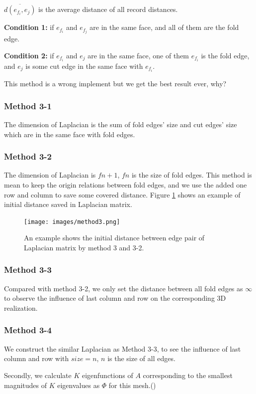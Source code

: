 $\overline{d(e_{f_i},e_j)}$ is the average distance of all record distances.  

\textbf{Condition 1:} if $e_{f_i}$ and  $e_{f_j}$ are in the same face, and all of them are the fold edge.

\textbf{Condition 2:} if $e_{f_i}$ and  $e_{j}$ are in the same face, one of them $e_{f_i}$ is the fold edge, and $e_j$ is some cut edge in the same face with $e_{f_i}$.

This method is a wrong implement but we get the best result ever, why?

\subsubsection{Method 3-1}
The dimension of Laplacian is the sum of fold edges' size and cut edges' size which are in the same face with fold edges. 

\subsubsection{Method 3-2}
The dimension of Laplacian is $fn + 1$, $fn$ is the size of fold edges. This method is mean to keep the origin relations between fold edges, and we use the added one row and column to save some covered distance. Figure \ref{fig:method} shows an example of initial distance saved in Laplacian matrix.

\begin{figure}[ht]
	\centering
	\texttt{[image: images/method3.png]}
	\caption{An example shows the initial distance between edge pair of Laplacian matrix by method 3 and 3-2. }
	\label{fig:method}
\end{figure}

\subsubsection{Method 3-3}
Compared with method 3-2, we only set the distance between all fold edges as $\infty$ to observe the influence of last column and row on the corresponding 3D realization.

\subsubsection{Method 3-4}
We construct the similar Laplacian as Method 3-3, to see the influence of last column and row with $size = n$, $n$ is the size of all edges.

Secondly, we calculate $K$ eigenfunctions of $A$ corresponding to the smallest magnitudes of $K$ eigenvalues as $\Phi$ for this mesh.({\color{blue}{We now use ``scipy.sparse.linalg.eigs" in python to solve this problem. It seems that it is also use ``ARPACK" routines as backend the same as other solvers. We choose ``SM" mode to make the solver to choose eigenvalues with smallest magnitudes}})

